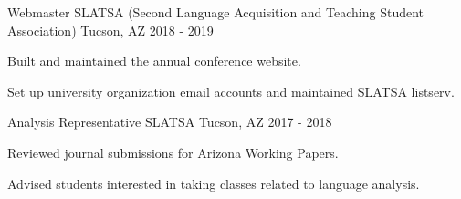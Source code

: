 \begin{cventries}

\cventry
{Webmaster} %
{SLATSA  (Second Language Acquisition and Teaching Student Association)} %
{Tucson, AZ} %
{2018 - 2019} %
{ %
\begin{cvitems}
\item {Built and maintained the annual conference website.}
\item {Set up university organization email accounts and maintained SLATSA listserv.}
\end{cvitems}
}


\cventry
{Analysis Representative} %
{SLATSA } %
{Tucson, AZ} %
{2017 - 2018} %
{ %
\begin{cvitems}
\item {Reviewed journal submissions for Arizona Working Papers.}
\item {Advised students interested in taking classes related to language analysis.}
\end{cvitems}
}


\end{cventries}